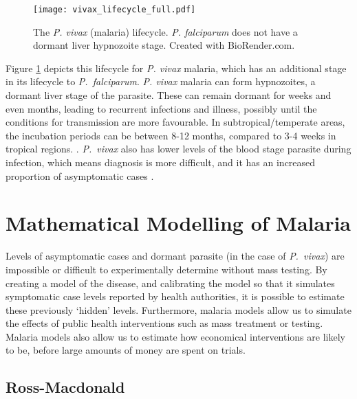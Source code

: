 \begin{figure}[htbp]
    \centering
    \texttt{[image: vivax\_lifecycle\_full.pdf]}
    \caption{
        The \emph{P. vivax} (malaria) lifecycle. \emph{P. falciparum}
        does not have a dormant liver hypnozoite stage. Created with
        BioRender.com.
    }
    \label{fig:mal_lc}
\end{figure}

Figure \ref{fig:mal_lc} depicts this lifecycle for \emph{P. vivax} malaria,
which has an additional stage in
its lifecycle to \textit{P.\ falciparum}. \emph{P. vivax} malaria can form
hypnozoites, a
dormant liver stage of the parasite. These can remain dormant for weeks and
even months, leading to recurrent infections and illness, possibly until the
conditions for transmission are more favourable. In subtropical/temperate
areas, the incubation periods can be between 8-12 months, compared to 3-4 weeks
in tropical regions. \cite{price_plasmodium_2020}. \textit{P.\ vivax} also has
lower levels of the blood stage parasite during infection, which means
diagnosis is more difficult, and it has an increased proportion of asymptomatic
cases \parencite{adams_biology_2017}.

\section{Mathematical Modelling of Malaria}

Levels of asymptomatic cases and dormant parasite (in the case of
\textit{P.\ vivax}) are impossible or difficult to experimentally determine
without mass testing. By creating a model of the disease, and calibrating the
model so that it simulates symptomatic case levels reported by health
authorities, it is possible to estimate these previously `hidden' levels.
Furthermore, malaria models allow us to simulate the effects of public health
interventions such as mass treatment or testing. Malaria models also allow
us to estimate how economical interventions are likely to be,
before large amounts of money are spent on trials.

\subsection*{Ross-Macdonald}

